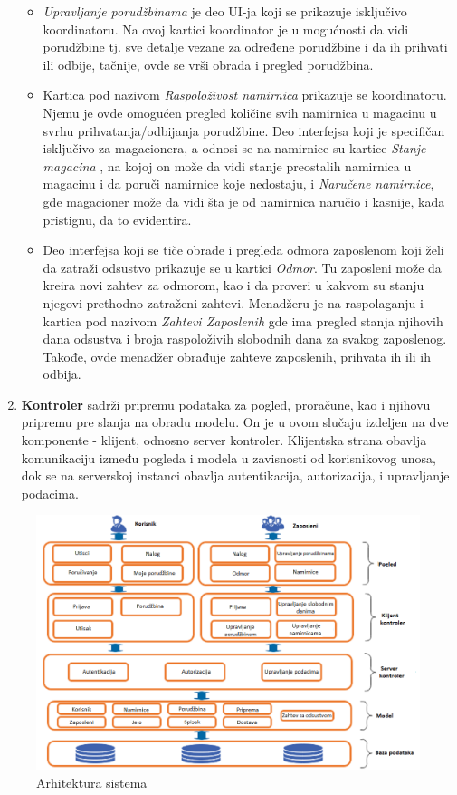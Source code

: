 \begin{enumerate}
\begin{itemize}
    \item \emph{Upravljanje porudžbinama} je deo UI-ja koji se prikazuje isključivo koordinatoru. Na ovoj kartici koordinator je u mogućnosti da vidi porudžbine tj. sve detalje vezane za određene porudžbine i da ih prihvati ili odbije, tačnije, ovde se vrši obrada i pregled porudžbina.
    
    \item Kartica pod nazivom \emph{Raspoloživost namirnica} prikazuje se koordinatoru. Njemu je ovde omogućen pregled količine svih namirnica u magacinu u svrhu prihvatanja/odbijanja porudžbine. Deo interfejsa koji je specifičan isključivo za magacionera, a odnosi se na namirnice su kartice \emph{Stanje magacina} , na kojoj on može da vidi stanje preostalih namirnica u magacinu i da poruči namirnice koje nedostaju, i \emph{Naručene namirnice}, gde magacioner može da vidi šta je od namirnica naručio i kasnije, kada pristignu, da to evidentira.
    
    
    \item Deo interfejsa koji se tiče obrade i pregleda odmora zaposlenom koji želi da zatraži odsustvo prikazuje se u kartici \emph{Odmor}. Tu zaposleni može da kreira novi zahtev za odmorom, kao i da proveri u kakvom su stanju njegovi prethodno zatraženi zahtevi.
    Menadžeru je na raspolaganju i kartica pod nazivom \emph{Zahtevi Zaposlenih} gde ima pregled stanja njihovih dana odsustva i broja raspoloživih slobodnih dana za svakog zaposlenog. Takođe, ovde menadžer obrađuje zahteve zaposlenih, prihvata ih ili ih odbija.
    \end{itemize}
    \item \textbf{Kontroler} sadrži pripremu podataka za pogled, proračune, kao i njihovu pripremu pre slanja na obradu modelu. On je u ovom slučaju izdeljen na dve komponente - klijent, odnosno server kontroler. Klijentska strana obavlja komunikaciju između pogleda i modela u zavisnosti od korisnikovog unosa, dok se na serverskoj instanci obavlja autentikacija, autorizacija, i upravljanje podacima.
\end{enumerate}

\begin{figure}[!ht]
    \leavevmode
    \centering
    \advance\leftskip-1.3cm
    \includegraphics[width=1.2\textwidth]{slike/arh1.png}
    \caption{Arhitektura sistema}
    \label{fig:slika11}
\end{figure}
\leavevmode
